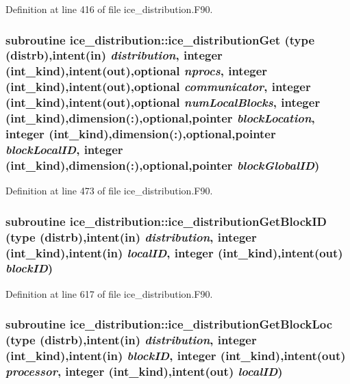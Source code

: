 Definition at line 416 of file ice\_\-distribution.F90.\hypertarget{namespaceice__distribution_af81cb7cb3d7c4651703ab5141b5a98d1}{
\subsubsection[{ice\_\-distributionGet}]{\setlength{\rightskip}{0pt plus 5cm}subroutine ice\_\-distribution::ice\_\-distributionGet (type (distrb),intent(in) {\em distribution}, \/  integer (int\_\-kind),intent(out),optional {\em nprocs}, \/  integer (int\_\-kind),intent(out),optional {\em communicator}, \/  integer (int\_\-kind),intent(out),optional {\em numLocalBlocks}, \/  integer (int\_\-kind),dimension(:),optional,pointer {\em blockLocation}, \/  integer (int\_\-kind),dimension(:),optional,pointer {\em blockLocalID}, \/  integer (int\_\-kind),dimension(:),optional,pointer {\em blockGlobalID})}}
\label{namespaceice__distribution_af81cb7cb3d7c4651703ab5141b5a98d1}


Definition at line 473 of file ice\_\-distribution.F90.\hypertarget{namespaceice__distribution_a9a144b7580fefe29842479948f00f810}{
\subsubsection[{ice\_\-distributionGetBlockID}]{\setlength{\rightskip}{0pt plus 5cm}subroutine ice\_\-distribution::ice\_\-distributionGetBlockID (type (distrb),intent(in) {\em distribution}, \/  integer (int\_\-kind),intent(in) {\em localID}, \/  integer (int\_\-kind),intent(out) {\em blockID})}}
\label{namespaceice__distribution_a9a144b7580fefe29842479948f00f810}


Definition at line 617 of file ice\_\-distribution.F90.\hypertarget{namespaceice__distribution_a07a309ffe5759ad00fc5f886ce65c175}{
\subsubsection[{ice\_\-distributionGetBlockLoc}]{\setlength{\rightskip}{0pt plus 5cm}subroutine ice\_\-distribution::ice\_\-distributionGetBlockLoc (type (distrb),intent(in) {\em distribution}, \/  integer (int\_\-kind),intent(in) {\em blockID}, \/  integer (int\_\-kind),intent(out) {\em processor}, \/  integer (int\_\-kind),intent(out) {\em localID})}}
\label{namespaceice__distribution_a07a309ffe5759ad00fc5f886ce65c175}


